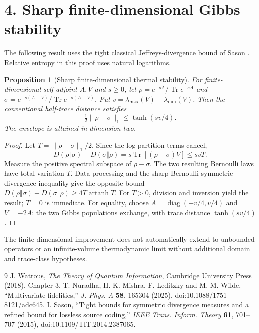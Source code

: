 \documentclass[10pt,letterpaper]{article}
\newtheorem{proposition}{Proposition}
\newcommand{\Tr}{\operatorname{Tr}}
\begin{document}
\section*{4. Sharp finite-dimensional Gibbs stability}
The following result uses the tight classical Jeffreys-divergence bound of Sason \cite{sason}. Relative entropy in this proof uses natural logarithms.
\begin{proposition}[Sharp finite-dimensional thermal stability]
For finite-dimensional self-adjoint $A,V$ and $s\ge0$, let
$\rho=e^{-sA}/\Tr e^{-sA}$ and
$\sigma=e^{-s(A+V)}/\Tr e^{-s(A+V)}$. Put
$v=\lambda_{\max}(V)-\lambda_{\min}(V)$.
Then the conventional half-trace distance satisfies
\[
 \boxed{\quad \tfrac12\|\rho-\sigma\|_1
                \le\tanh(sv/4).\quad}
\]
The envelope is attained in dimension two.
\end{proposition}
\begin{proof}
Let $T=\|\rho-\sigma\|_1/2$. Since the log-partition terms cancel,
\[
 D(\rho\Vert\sigma)+D(\sigma\Vert\rho)
   =s\Tr[(\rho-\sigma)V]\le svT.
\]
Measure the positive spectral subspace of $\rho-\sigma$. The two resulting
Bernoulli laws have total variation $T$. Data processing and the sharp
Bernoulli symmetric-divergence inequality give the opposite bound
$D(\rho\Vert\sigma)+D(\sigma\Vert\rho)\ge4T\operatorname{artanh}T$.
For $T>0$, division and inversion yield the result; $T=0$ is immediate.
For equality, choose $A=\operatorname{diag}(-v/4,v/4)$ and $V=-2A$:
the two Gibbs populations exchange, with trace distance $\tanh(sv/4)$.
\end{proof}
The finite-dimensional improvement does not automatically extend to
unbounded operators or an infinite-volume thermodynamic limit without
additional domain and trace-class hypotheses.

\begin{thebibliography}{9}
 J. Watrous, \emph{The Theory of Quantum Information},
 Cambridge University Press (2018), Chapter 3.
 T. Nuradha, H. K. Mishra, F. Leditzky and M. M. Wilde,
 ``Multivariate fidelities,'' \emph{J. Phys. A} \textbf{58}, 165304 (2025),
 doi:10.1088/1751-8121/adc645.
 I. Sason, ``Tight bounds for symmetric divergence measures
 and a refined bound for lossless source coding,''
 \emph{IEEE Trans. Inform. Theory} \textbf{61}, 701--707 (2015),
 doi:10.1109/TIT.2014.2387065.
\end{thebibliography}
\end{document}
